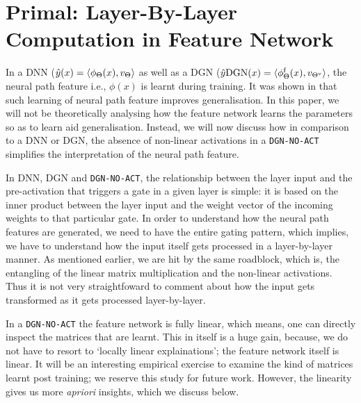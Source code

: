 \section{Primal: Layer-By-Layer Computation in Feature Network}\label{sec:primal}
In a DNN ($\hat{y}(x)=\langle \phi_\Theta(x),v_{\Theta}\rangle$ as well as a DGN ($\hat{y}{\text{DGN}}(x)=\langle \phi_\Theta^{\textrm{f}}(x),v_{{\Theta}^{\text{v}}}\rangle$, the neural path feature i.e., $\phi(x)$ is learnt during training. It was shown in \citep{npk} that such learning of neural path feature improves generalisation. In this paper, we will not be theoretically analysing how the feature network learns the parameters so as to learn aid generalisation. Instead, we will now discuss how in comparison to a DNN or DGN, the absence of non-linear activations in a \texttt{DGN-NO-ACT} simplifies the interpretation of the neural path feature. 

In DNN, DGN and \texttt{DGN-NO-ACT}, the relationship between the layer input and the pre-activation that triggers a gate in a given layer is simple: it is based on the inner product between the layer input and the weight vector of the incoming weights to that particular gate. In order to understand how the neural path features are generated, we need to have the entire gating pattern, which implies, we have to understand how the input itself gets processed in a layer-by-layer manner. As mentioned earlier, we are hit by the same roadblock, which is, the entangling of the linear matrix multiplication and the non-linear activations. Thus it is not very straightfoward to comment about how the input gets transformed as it gets processed layer-by-layer. 


In a \texttt{DGN-NO-ACT} the feature network is fully linear, which means, one can directly inspect the matrices that are learnt. This in itself is a huge gain, because, we do not have to resort to  `locally linear explainations'; the feature network itself is linear. It will be an interesting empirical exercise to examine the kind of matrices learnt post training; we reserve this study for future work. However, the linearity gives us more \emph{apriori} insights, which we discuss below. 

